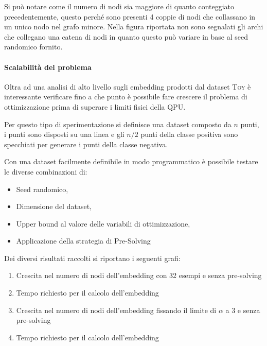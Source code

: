 \documentclass[12pt]{article}
\begin{document}
Si può notare come il numero di nodi sia maggiore di quanto conteggiato precedentemente, questo perché sono presenti 4 coppie di nodi che collassano in un unico nodo nel grafo minore.
Nella figura riportata non sono segnalati gli archi che collegano una catena di nodi in quanto questo può variare in base al seed randomico fornito.

\paragraph{Scalabilità del problema}
Oltra ad una analisi di alto livello sugli embedding prodotti dal dataset \textsc{Toy} è interessante verificare fino a che punto è possibile fare crescere il problema di ottimizzazione prima di superare i limiti fisici della QPU.

Per questo tipo di sperimentazione si definisce una dataset composto da $n$ punti, i punti sono disposti su una linea e gli $n/2$ punti della classe positiva sono specchiati per generare i punti della classe negativa.

Con una dataset facilmente definibile in modo programmatico è possibile testare le diverse combinazioni di: 
\begin{itemize}
  \item Seed randomico,
  \item Dimensione del dataset,
  \item Upper bound al valore delle variabili di ottimizzazione,
  \item Applicazione della strategia di Pre-Solving 
\end{itemize}

Dei diversi risultati raccolti si riportano i seguenti grafi:
\begin{enumerate}
  \item Crescita nel numero di nodi dell'embedding con 32 esempi e senza pre-solving
  \item Tempo richiesto per il calcolo dell'embedding
  \item Crescita nel numero di nodi dell'embedding fissando il limite di $\alpha$ a 3 e senza pre-solving
  \item Tempo richiesto per il calcolo dell'embedding
\end{enumerate}
\end{document}
